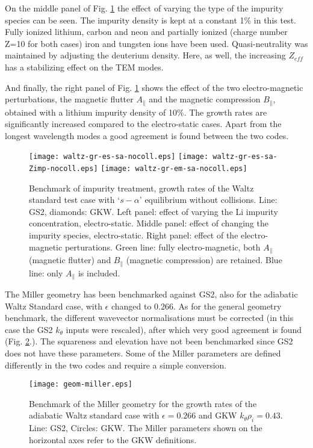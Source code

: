 On the middle panel of Fig. \ref{impurities} the effect of varying the type of the impurity species can be seen. The impurity density is kept at a constant 1\% in this test. Fully ionized lithium, carbon and neon and partially ionized (charge number Z=10 for both cases) iron and tungsten ions have been used. Quasi-neutrality was maintained by adjusting the deuterium density. Here, as well, the increasing $Z_{eff}$ has a stabilizing effect on the TEM modes.

And finally, the right panel of Fig. \ref{impurities} shows the effect of the two electro-magnetic perturbations, the magnetic flutter $A_{\parallel}$ and the magnetic compression $B_{\parallel}$, obtained with a lithium impurity density of 10\%. The growth rates are significantly increased compared to the electro-static cases. Apart from the longest wavelength modes a good agreement is found between the two codes. 

\begin{figure}[htb]
\begin{center}
\texttt{[image: waltz-gr-es-sa-nocoll.eps]}
\texttt{[image: waltz-gr-es-sa-Zimp-nocoll.eps]}
\texttt{[image: waltz-gr-em-sa-nocoll.eps]}
\caption{Benchmark of impurity treatment, growth rates of the Waltz standard test case with `$s-\alpha$' equilibrium without collisions. Line: GS2, diamonds: GKW. Left panel: effect of varying the Li impurity concentration, electro-static. Middle panel: effect of changing the impurity species, electro-static. Right panel: effect of the electro-magnetic perturations. Green line: fully electro-magnetic, both $A_{\parallel}$ (magnetic flutter) and $B_{\parallel}$ (magnetic compression) are retained. Blue line: only $A_{\parallel}$ is included.}
\label{impurities}
\end{center}
\end{figure}

The Miller geometry has been benchmarked against GS2, also for the adiabatic Waltz Standard case, with $\epsilon$ changed to 0.266.  As for the general geometry benchmark, the
different wavevector normalisations must be corrected (in this case the GS2 $k_\theta$ inputs were rescaled), after which very good agreement is found (Fig. \ref{miller}.).  The squareness and elevation have not been
benchmarked since GS2 does not have these parameters.  Some of the Miller parameters are defined differently in the two codes and require a simple conversion.

\begin{figure}[htb]
\begin{center}
\texttt{[image: geom-miller.eps]}
\caption{Benchmark of the Miller geometry for the growth rates of the adiabatic
Waltz standard case with $\epsilon=0.266$ and GKW $k_\theta \rho_i=0.43$. Line: GS2, Circles: GKW.  The Miller
parameters shown on the horizontal axes refer to the GKW definitions.}
\label{miller}
\end{center}
\end{figure}


